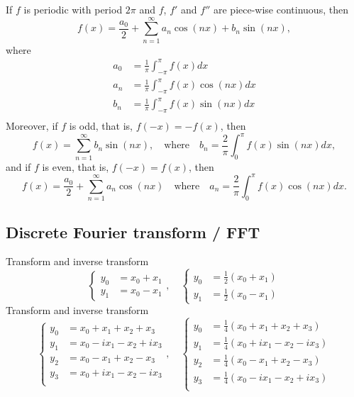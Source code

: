 \documentclass[12pt]{article}
\begin{document}
If $f$ is periodic with period $2\pi$ and $f$, $f'$ and $f''$ are piece-wise continuous, then
$$
f(x)
=\frac{a_0}{2}
+\sum_{n=1}^\infty a_n\cos(nx)+b_n\sin(nx),
$$
where
\begin{equation*}
\begin{split}
a_0&=\frac{1}{\pi}\int_{-\pi}^{\pi}
f(x)dx\\
a_n&=\frac{1}{\pi}\int_{-\pi}^{\pi}
f(x)\cos(nx)dx\\
b_n&=\frac{1}{\pi}\int_{-\pi}^{\pi}
f(x)\sin(nx)dx\\
\end{split}
\end{equation*}
Moreover, if $f$ is odd, that is, $f(-x)=-f(x)$,
then
$$
f(x)
=\sum_{n=1}^\infty b_n\sin(nx),
\quad\textrm{where}\quad
b_n=\frac{2}{\pi}\int_{0}^{\pi}
f(x)\sin(nx)dx,
$$
and if $f$ is even, that is, $f(-x)=f(x)$, then
$$
f(x)
=\frac{a_0}{2}
+\sum_{n=1}^\infty a_n\cos(nx)
\quad\textrm{where}\quad
a_n=\frac{2}{\pi}\int_{0}^{\pi}
f(x)\cos(nx)dx.
$$

\subsection*{Discrete Fourier transform / FFT}

Transform and inverse transform
$$
\begin{cases}
y_0&=x_0+x_1\\
y_1&=x_0-x_1
\end{cases},\quad
\begin{cases}
y_0&=\frac{1}{2}(x_0+x_1)\\
y_1&=\frac{1}{2}(x_0-x_1)
\end{cases}
$$
Transform and inverse transform
$$
\begin{cases}
y_0&=x_0+x_1+x_2+x_3\\
y_1&=x_0-ix_1-x_2+ix_3\\
y_2&=x_0-x_1+x_2-x_3\\
y_3&=x_0+ix_1-x_2-ix_3\\
\end{cases},\quad
\begin{cases}
y_0&=\frac{1}{4}(x_0+x_1+x_2+x_3)\\
y_1&=\frac{1}{4}(x_0+ix_1-x_2-ix_3)\\
y_2&=\frac{1}{4}(x_0-x_1+x_2-x_3)\\
y_3&=\frac{1}{4}(x_0-ix_1-x_2+ix_3)\\
\end{cases}
$$

\newpage
\end{document}
